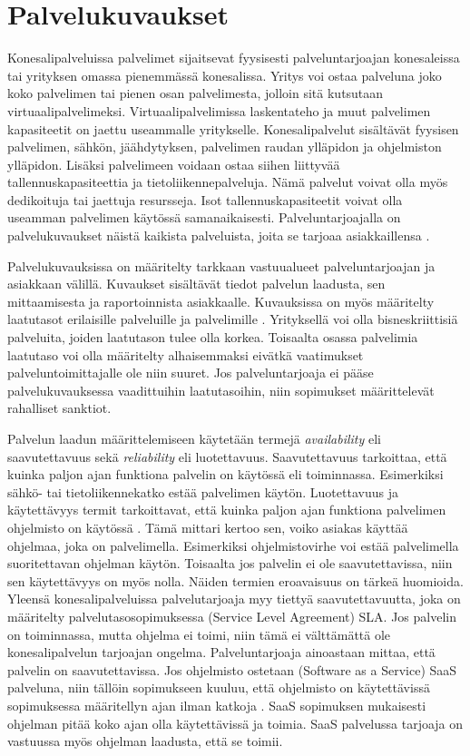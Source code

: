 \section{Palvelukuvaukset}
Konesalipalveluissa palvelimet sijaitsevat fyysisesti palveluntarjoajan konesaleissa tai yrityksen omassa pienemmässä konesalissa. Yritys voi ostaa palveluna joko koko palvelimen tai pienen osan palvelimesta, jolloin sitä kutsutaan virtuaalipalvelimeksi. Virtuaalipalvelimissa laskentateho ja muut palvelimen kapasiteetit on jaettu useammalle yritykselle. Konesalipalvelut sisältävät fyysisen palvelimen, sähkön, jäähdytyksen, palvelimen raudan ylläpidon ja ohjelmiston ylläpidon. Lisäksi palvelimeen voidaan ostaa siihen liittyvää tallennuskapasiteettia ja tietoliikennepalveluja. Nämä palvelut voivat olla myös dedikoituja tai jaettuja resursseja. Isot tallennuskapasiteetit voivat olla useamman palvelimen käytössä samanaikaisesti. Palveluntarjoajalla on palvelukuvaukset näistä kaikista palveluista, joita se tarjoaa asiakkaillensa \citep{handbook}.

Palvelukuvauksissa on määritelty tarkkaan vastuualueet palveluntarjoajan ja asiakkaan välillä. Kuvaukset sisältävät tiedot palvelun laadusta, sen mittaamisesta ja raportoinnista asiakkaalle. Kuvauksissa on myös määritelty laatutasot erilaisille palveluille ja palvelimille \citep{handbook}. Yrityksellä voi olla bisneskriittisiä palveluita, joiden laatutason tulee olla korkea. Toisaalta osassa palvelimia laatutaso voi olla määritelty alhaisemmaksi eivätkä vaatimukset palveluntoimittajalle ole niin suuret. Jos palveluntarjoaja ei pääse palvelukuvauksessa vaadittuihin laatutasoihin, niin sopimukset määrittelevät rahalliset sanktiot.

Palvelun laadun määrittelemiseen käytetään termejä \emph{availability} eli saavutettavuus sekä \emph{reliability} eli luotettavuus. Saavutettavuus tarkoittaa, että kuinka paljon ajan funktiona palvelin on käytössä eli toiminnassa. Esimerkiksi sähkö- tai tietoliikennekatko estää palvelimen käytön. Luotettavuus ja käytettävyys termit tarkoittavat, että kuinka paljon ajan funktiona palvelimen ohjelmisto on käytössä \citep{service_availability} \citep{itil}. Tämä mittari kertoo sen, voiko asiakas käyttää ohjelmaa, joka on palvelimella. Esimerkiksi ohjelmistovirhe voi estää palvelimella suoritettavan ohjelman käytön. Toisaalta jos palvelin ei ole saavutettavissa, niin sen käytettävyys on myös nolla. Näiden termien eroavaisuus on tärkeä huomioida. Yleensä konesalipalveluissa palvelutarjoaja myy tiettyä saavutettavuutta, joka on määritelty palvelutasosopimuksessa (Service Level Agreement) SLA. Jos palvelin on toiminnassa, mutta ohjelma ei toimi, niin tämä ei välttämättä ole konesalipalvelun tarjoajan ongelma. Palveluntarjoaja ainoastaan mittaa, että palvelin on saavutettavissa. Jos ohjelmisto ostetaan (Software as a Service) SaaS palveluna, niin tällöin sopimukseen kuuluu, että ohjelmisto on käytettävissä sopimuksessa määritellyn ajan ilman katkoja \citep{software_service}. SaaS sopimuksen mukaisesti ohjelman pitää koko ajan olla käytettävissä ja toimia. SaaS palvelussa tarjoaja on vastuussa myös ohjelman laadusta, että se toimii.

